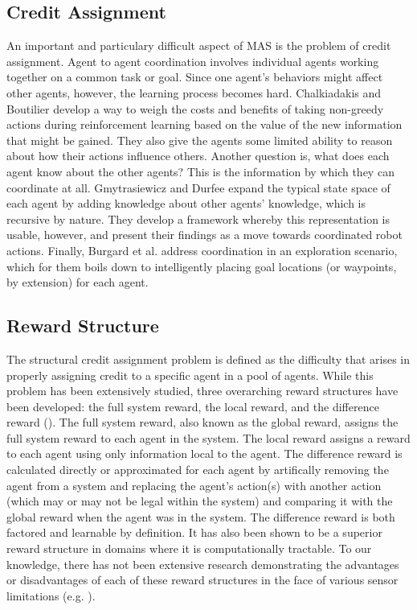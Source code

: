 \documentclass[letterpaper, 10 pt, conference]{ieeeconf}  %
\begin{document}
\subsection{Credit Assignment}
An important and particulary difficult aspect of MAS is the problem of
credit assignment. Agent to agent coordination involves individual
agents working together on a common task or goal. Since one agent’s
behaviors might affect other agents, however, the learning process
becomes hard. Chalkiadakis and Boutilier \cite{chalkiadakis2003coordination} develop a way to weigh
the costs and benefits of taking non-greedy actions during
reinforcement learning based on the value of the new information that
might be gained. They also give the agents some limited ability to
reason about how their actions influence others. Another question is,
what does each agent know about the other agents? This is the
information by which they can coordinate at all. Gmytrasiewicz and
Durfee \cite{gmytrasiewicz2000rational} expand the typical state space of each agent by adding
knowledge about other agents’ knowledge, which is recursive by
nature. They develop a framework whereby this representation is
usable, however, and present their findings as a move towards
coordinated robot actions. Finally, Burgard et al. \cite{burgard2005coordinated} address
coordination in an exploration scenario, which for them boils down to
intelligently placing goal locations (or waypoints, by extension) for
each agent.

\subsection{Reward Structure}
The structural credit assignment problem is defined as the difficulty that arises in properly assigning credit to a specific agent in a pool of agents.  While this problem has been extensively studied, three overarching reward structures have been developed: the full system reward, the local reward, and the difference reward (\hspace{1sp}\cite{weiss2013multiagent}).  The full system reward, also known as the global reward, assigns the full system reward to each agent in the system.  The local reward assigns a reward to each agent using only information local to the agent. The difference reward is calculated directly or approximated for each agent by artifically removing the agent from a system and replacing the agent's action(s) with another action (which may or may not be legal within the system) and comparing it with the global reward when the agent was in the system. The difference reward is both factored and learnable by definition. It has also been shown to be a superior reward structure in domains where it is computationally tractable. To our knowledge, there has not been extensive research demonstrating the advantages or disadvantages of each of these reward structures in the face of various sensor limitations (e.g. \cite{tumer2002learning, turner2006designing}). 
\end{document}
